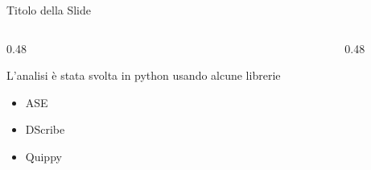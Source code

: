 \begin{frame}{Titolo della Slide}
    \begin{columns}[c]        
        \begin{column}{0.48\textwidth}
        
        L'analisi è stata svolta in python usando alcune librerie
        
        \begin{itemize}
        	\item ASE
        	\item DScribe
        	\item Quippy
        \end{itemize}
        
        \end{column}
        \begin{column}{0.48\textwidth}
        
            \centering
            
            \vspace{0.4cm} %
            
            
        \end{column}
    \end{columns}
\end{frame}
